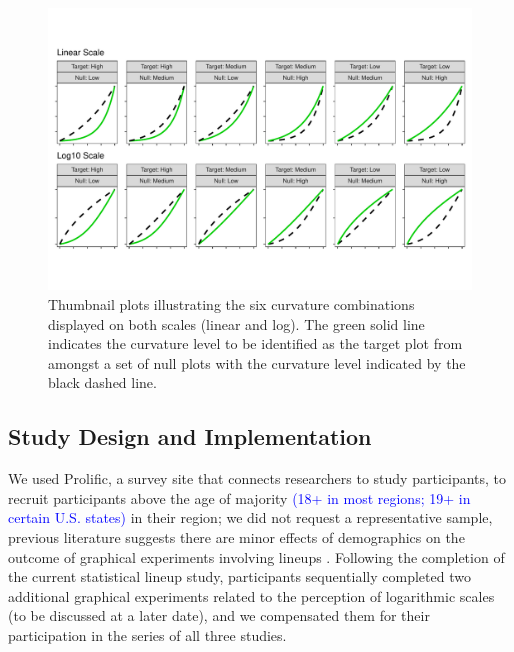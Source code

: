 \documentclass[12pt]{article}
\begin{document}
\begin{figure}[tbp]

{\centering \includegraphics[width=1\linewidth,]{logarithmic-lineups-revisions_files/figure-latex/curvature-combination-example-1} 

}

\caption[Lineup curvature combinations]{Thumbnail plots illustrating the six curvature combinations displayed on both scales (linear and log). The green solid line indicates the curvature level to be identified as the target plot from amongst a set of null plots with the curvature level indicated by the black dashed line.}\label{fig:curvature-combination-example}
\end{figure}

\hypertarget{study-design-and-implementation}{%
\subsection{Study Design and
Implementation}\label{study-design-and-implementation}}

We used Prolific, a survey site that connects researchers to study
participants, to recruit participants above the age of majority
{\textcolor{blue}{(18+ in most regions; 19+ in certain U.S. states)}} in
their region; we did not request a representative sample, previous
literature suggests there are minor effects of demographics on the
outcome of graphical experiments involving lineups
\citep{vanderplas2015spatial, majumder_validation_2013}. Following the
completion of the current statistical lineup study, participants
sequentially completed two additional graphical experiments related to
the perception of logarithmic scales (to be discussed at a later date),
and we compensated them for their participation in the series of all
three studies.
\end{document}
